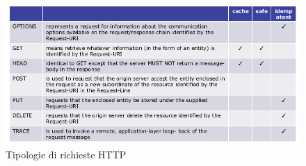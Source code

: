 \documentclass[a4paper,12pt, oneside]{book}
\begin{document}
\begin{figure}
    \caption{Tipologie di richieste HTTP}
    \label{fig:httpMethod}
	\includegraphics[scale=0.7]{img/http.png}
\end{figure}
\end{document}
